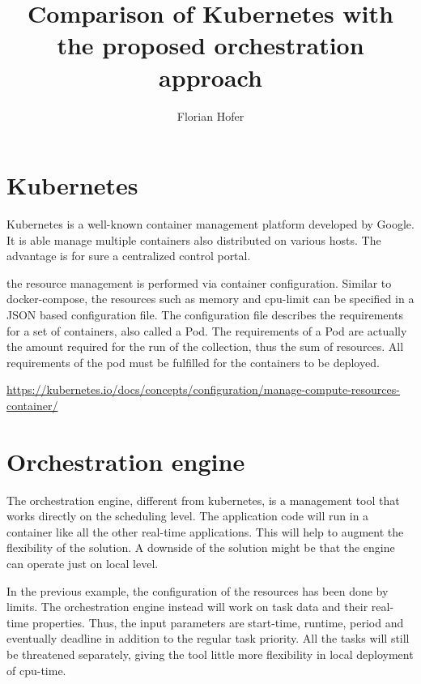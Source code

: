 \documentclass[]{scrartcl}
\title{Comparison of Kubernetes with the proposed orchestration approach}
\author{Florian Hofer}
\begin{document}
\maketitle

\begin{abstract}

\end{abstract}

\section{Kubernetes}

Kubernetes is a well-known container management platform developed by Google. It is able manage multiple containers also distributed on various hosts. The advantage is for sure a centralized control portal. 

the resource management is performed via container configuration. Similar to docker-compose, the resources such as memory and cpu-limit can be specified in a JSON based configuration file. The configuration file describes the requirements for a set of containers, also called a Pod. The requirements of a Pod are actually the amount required for the run of the collection, thus the sum of resources. All requirements of the pod must be fulfilled for the containers to be deployed.


\url{https://kubernetes.io/docs/concepts/configuration/manage-compute-resources-container/}


\section{Orchestration engine}

The orchestration engine, different from kubernetes, is a management tool that works directly on the scheduling level. The application code will run in a container like all the other real-time applications. This will help to augment the flexibility of the solution. A downside of the solution might be that the engine can operate just on local level.

In the previous example, the configuration of the resources has been done by limits. The orchestration engine instead will work on task data and their real-time properties. 
Thus, the input parameters are start-time, runtime, period and eventually deadline in addition to the regular task priority.
All the tasks will still be threatened separately, giving the tool little more flexibility in local deployment of cpu-time.
\end{document}
